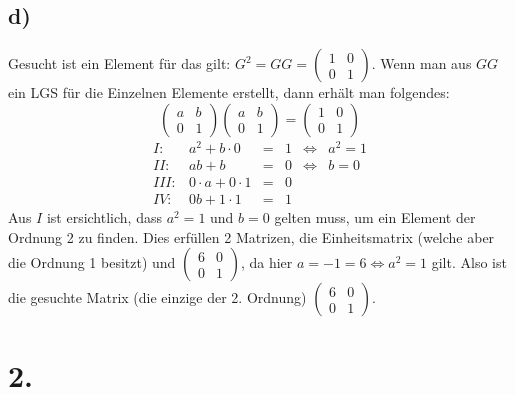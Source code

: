 \documentclass[a4paper]{scrartcl}
\begin{document}
	\subsection{d)}
		Gesucht ist ein Element für das gilt: \(G^2=GG=\begin{pmatrix}1&0\\0&1\end{pmatrix}\). Wenn
		man aus \(GG\) ein LGS für die Einzelnen Elemente erstellt, dann erhält man folgendes:
		\[\begin{pmatrix}
			a&b\\0&1
		\end{pmatrix}
		\begin{pmatrix}
			a&b\\0&1
		\end{pmatrix}=\begin{pmatrix}1&0\\0&1\end{pmatrix}\]
		\[
		\begin{array}{lrclcl}
			I:&a^2+b\cdot 0 &=& 1 &\Leftrightarrow & a^2 = 1 \\
			II:&ab+b &=& 0 &\Leftrightarrow & b=0\\
			III:& 0\cdot a+0\cdot 1 &=& 0 \\
			IV:& 0b+1\cdot 1 &=&1		
		\end{array}
		\]
		Aus \(I\) ist ersichtlich, dass \(a^2=1\) und \(b=0\) gelten muss, um ein Element der Ordnung 
		2 zu finden. Dies erfüllen 2 Matrizen, die Einheitsmatrix (welche aber die Ordnung 1 besitzt) 
		und \(\begin{pmatrix}6&0\\0&1\end{pmatrix}\), da hier \(a=-1=6\Leftrightarrow a^2 = 1\) gilt.
		Also ist die gesuchte Matrix (die einzige der 2. Ordnung)
		\(\begin{pmatrix}6&0\\0&1\end{pmatrix}\).
			
\section{2.}
\end{document}

